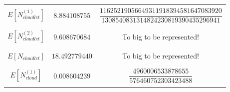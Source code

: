 \documentclass[10pt,a4paper]{article}
\begin{document}
\begin{table}[h!]
\begin{adjustbox}{center=\textwidth}
\begin{tabular}{c|c|c}
     &&\\\hline &&\\
     
     $E[N^{(1)}_{cloudlet}]$ & $8.884108755$ & $\dfrac{11625219056649311918394581647083920}{1308540831314824230819390435296941}$ \\
     
     &&\\\hline &&\\
     
     $E[N^{(2)}_{cloudlet}]$ & $9.608670684$ & To big to be represented! \\
     
	 &&\\\hline &&\\
     
     $E[N_{cloudlet}]$ & $18.492779440$ & To big to be represented! \\     
     
	 &&\\\hline &&\\
     
     $E[N^{(1)}_{cloud}]$ & $0.008604239$ & $\dfrac{4960006533878655}{576460752303423488}$ \\
  
     &&\\


     \bottomrule

    \end{tabular}
    \end{adjustbox}
\end{table}
\end{document}
